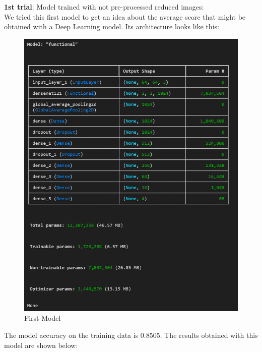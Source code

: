 \documentclass{article}
\begin{document}
\textbf{1st trial}: Model trained with not pre-processed reduced images:\\
We tried this first model to get an idea about the  average score that might be obtained with a Deep Learning model. Its architecture looks like this:

 \begin{figure}[H]
    \centering
    \includegraphics[width=0.8\linewidth]{DN121archsmall.png}
    \caption{First Model}
    \label{fig:DN121archsmall}
\end{figure}

The model accuracy on the training data is 0.8505. The results obtained with this model are shown below:
\end{document}
